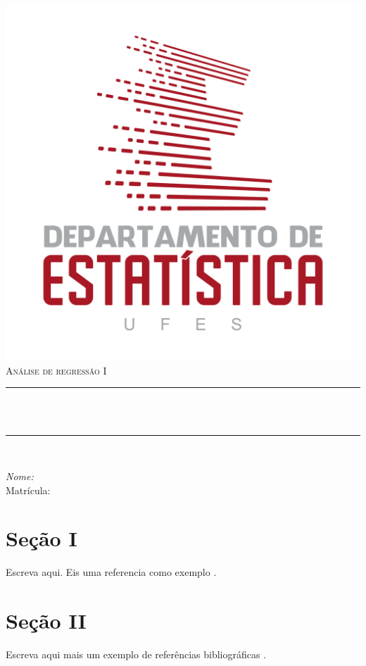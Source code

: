 \documentclass[12pt,oneside,oldfontcommands]{memoir}
\makeatletter
\def\maketitle{%
  \null
  \thispagestyle{empty}
  \begin{center}\leavevmode
       \normalfont
       \includegraphics[width=0.35\columnwidth]{figures/LogoDest.png}
       \vskip 0.5cm   
       \textsc{\Large Análise de regressão I}\\[0.5 cm]
	     {\large \@date\par}
       \vskip 1.0cm
	\rule{\linewidth}{0.2 mm} \\[0.4 cm]
	{ \huge \bfseries \@title}\\
	\rule{\linewidth}{0.2 mm} \\[1.5 cm]
	
    \begin{flushleft} \large
        \emph{Nome:} \studentone\\
        Matrícula: \studentonenumber
    \end{flushleft}
\end{center}
\vfill
\null
\cleardoublepage
}
\makeatother
\begin{document}
\maketitle
\frontmatter
\let\cleardoublepage\clearpage
\mainmatter
\sloppy




\section*{Seção I}
Escreva aqui. Eis uma referencia como exemplo \textcite{kendem:2002}.


\section*{Seção II}
Escreva aqui mais um exemplo de referências bibliográficas \autocite{rocha:2009}.



\printbibliography
\end{document}
